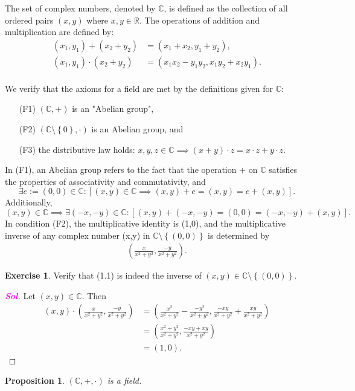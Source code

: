 \documentclass[12pt,openany]{book}
\newtheorem{proposition}[theorem]{Proposition}
\theoremstyle{definition}
\newtheorem{exercise}{Exercise}[section]
\newcommand{\set}[1]{\left\{#1\right\}}
\newcommand{\R}{\mathbb{R}}
\newcommand{\C}{\mathbb{C}}
\newcommand{\of}[1]{\left( #1 \right)}
\newcommand{\sol}{\textcolor{magenta}{\bf Sol}}
\begin{document}
	The set of complex numbers, denoted by $\C$, is defined as the collection of all ordered pairs $(x,y)$ where $x,y\in\R$. The operations of addition and multiplication are defined by:\begin{align*}
	(x_1,y_1)+(x_2+y_2)&=(x_1+x_2,y_1+y_2),\\
	(x_1,y_1)\cdot(x_2+y_2)&=(x_1x_2-y_1y_2,x_1y_2+x_2y_1).\\
	\end{align*}
	
	We verify that the axioms for a field are met by the definitions given for $\C$: \begin{itemize}
		\item[(F1)] $\of{\C,+}$ is an "Abelian group",
		\item[(F2)] $\of{\C\setminus\set{0},\cdot}$ is an Abelian group, and
		\item[(F3)] the distributive law holds: $x,y,z\in\C\implies\of{x+y}\cdot z=x\cdot z+y\cdot z$.
	\end{itemize}
	
	In (F1), an Abelian group refers to the fact that the operation $+$ on $\C$ satisfies the properties of associativity and commutativity, and \[
	\exists e:=(0,0)\in\C:[(x,y)\in\C\implies(x,y)+e=(x,y)=e+(x,y)].
	\] Additionally, \[
	(x,y)\in\C\implies\exists(-x,-y)\in\C:[(x,y)+(-x,-y)=(0,0)=(-x,-y)+(x,y)].
	\] In condition (F2), the multiplicative identity is (1,0), and the multiplicative inverse of any complex number (x,y) in $\C\setminus\set{(0,0)}$ is determined by \begin{align}
	\of{\frac{x}{x^2+y^2},\frac{-y}{x^2+y^2}}.
	\end{align}
	
	\begin{exercise}
		Verify that (1.1) is indeed the inverse of $(x,y)\in\C\setminus\set{(0,0)}$.
		\begin{proof}[\sol]
			Let $(x,y)\in\C$. Then \begin{align*}
			(x,y)\cdot\of{\frac{x}{x^2+y^2},\frac{-y}{x^2+y^2}}
			&=\of{\frac{x^2}{x^2+y^2}-\frac{-y^2}{x^2+y^2},\frac{-xy}{x^2+y^2}+\frac{xy}{x^2+y^2}}\\
			&=\of{\frac{x^2+y^2}{x^2+y^2},\frac{-xy+xy}{x^2+y^2}}\\
			&=(1,0).
			\end{align*}
		\end{proof}
	\end{exercise}
	
	\begin{tcolorbox}[title=Complex Numbers are Field]
		\begin{proposition}
			$\of{\C,+,\cdot}$ is a field.
		\end{proposition}
	\end{tcolorbox}
	
\end{document}

